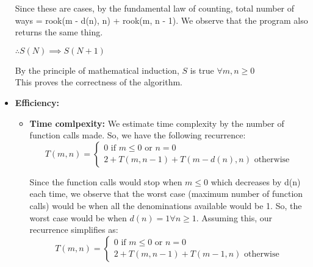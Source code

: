 \documentclass[answers]{exam}
\begin{document}
\begin{questions}
\begin{parts}
\begin{solution}
\begin{itemize}
{\begin{itemize}
{\begin{itemize}
{                                        Since these are cases, by the fundamental law of counting, total number of ways = rook(m - d(n), n) + rook(m, n - 1).
                                        We observe that the program also returns the same thing.
                                    }
                                \end{itemize}
                            }
                            \(\therefore S(N) \implies S(N + 1)\)
                        \end{itemize}
                        By the principle of mathematical induction, \(S\) is true \(\forall m, n \geq 0\)\\
                        This proves the correctness of the algorithm.
                    }
                    \item {
                        \textbf{Efficiency: }
                        \begin{itemize}
                            \item {
                                \textbf{Time comlpexity: } We estimate time complexity by the number of function calls made. So, we have the following
                                recurrence:
                                \begin{equation*}
                                    T(m, n) = \begin{cases}
                                        0 \text{ if } m \leq 0 \text{ or } n = 0 \\
                                        2 + T(m, n - 1) + T(m - d(n), n) \text{ otherwise}
                                    \end{cases}
                                \end{equation*}

                                Since the function calls would stop when \(m \leq 0\) which decreases by d(n) each time, we observe that the worst case
                                (maximum number of function calls) would be when all the denominations available would be 1. So, the worst case would be
                                when \(d(n) = 1 \forall n \geq 1\). Assuming this, our recurrence simplifies as:
                                \begin{equation*}
                                    T(m, n) = \begin{cases}
                                        0 \text{ if } m \leq 0 \text{ or } n = 0 \\
                                        2 + T(m, n - 1) + T(m - 1, n) \text{ otherwise}
                                    \end{cases}
                                \end{equation*}

}
\end{itemize}}
\end{itemize}
\end{solution}
\end{parts}
\end{questions}
\end{document}

